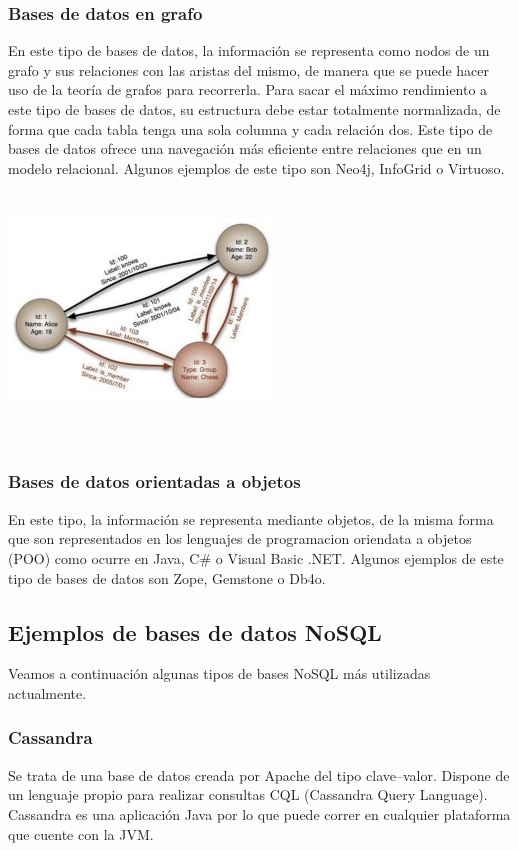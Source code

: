 \documentclass[twoside,twocolumn]{article}
\begin{document}
\subsubsection{Bases de datos en grafo}
En este tipo de bases de datos, la información se 
representa como nodos de un grafo y sus relaciones 
con las aristas del mismo, de manera que se puede 
hacer uso de la teoría de grafos para recorrerla. Para 
sacar el máximo rendimiento a este tipo de bases de datos,
 su estructura debe estar totalmente normalizada, de forma que 
 cada tabla tenga una sola columna y cada relación dos. Este tipo 
 de bases de datos ofrece una navegación más eficiente entre relaciones
  que en un modelo relacional. Algunos ejemplos de este tipo son Neo4j, 
  InfoGrid o Virtuoso.
  \includegraphics[width=7cm, height=7cm]{imagenes/img3.png}
\subsubsection{Bases de datos orientadas a objetos} 
En este tipo, la información se representa mediante objetos, de la misma 
forma que son representados en los lenguajes de programacion oriendata 
a objetos (POO) como ocurre en Java, C\# o Visual Basic .NET. Algunos ejemplos de este 
tipo de bases de datos son Zope, Gemstone o Db4o.
\subsection{Ejemplos de bases de datos NoSQL}  
Veamos a continuación algunas tipos de bases NoSQL más utilizadas actualmente. 
\subsubsection{Cassandra}
Se trata de una base de datos creada por Apache del tipo clave–valor. 
Dispone de un lenguaje propio para realizar consultas CQL (Cassandra Query Language). Cassandra es una aplicación Java por lo 
que puede correr en cualquier plataforma que cuente con la JVM.
\end{document}
